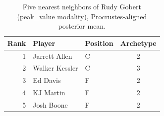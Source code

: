 \begin{table}[htbp]
  \centering\small
  \begin{tabular}{rllc}
    \toprule
    Rank & Player & Position & Archetype \\
    \midrule
    1 & Jarrett Allen & C & 2 \\
    2 & Walker Kessler & C & 3 \\
    3 & Ed Davis & F & 2 \\
    4 & KJ Martin & F & 2 \\
    5 & Josh Boone & F & 2 \\
    \bottomrule
  \end{tabular}
  \caption{Five nearest neighbors of Rudy Gobert (peak_value modality), Procrustes-aligned posterior mean.}
  \label{tab:Rudy_Gobert_neighbors_peak_value}
\end{table}

